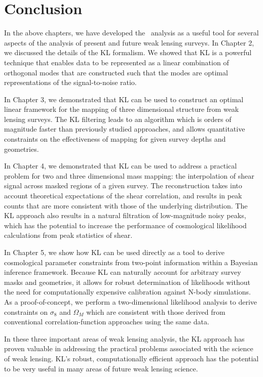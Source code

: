 \chapter{Conclusion}
In the above chapters, we have developed the \KL\ analysis as a useful tool
for several aspects of the analysis of present and future weak lensing
surveys.  In Chapter 2, we discussed the details of the KL formalism.
We showed that KL is a powerful technique that enables data to be represented
as a linear combination of orthogonal modes that are constructed such that
the modes are optimal representations of the signal-to-noise ratio.

In Chapter 3, we demonstrated that KL can be used to construct an optimal
linear framework for the mapping of three dimensional structure from weak
lensing surveys.  The KL filtering leads to an algorithm which is orders of
magnitude faster than previously studied approaches, and allows quantitative
constraints on the effectiveness of mapping for given survey depths and
geometries.

In Chapter 4, we demonstrated that KL can be used to address a practical problem
for two and three dimensional mass mapping: the interpolation of shear signal
across masked regions of a given survey.  The reconstruction takes into
account theoretical expectations of the shear correlation, and results in
peak counts that are more consistent with those of the underlying
distribution.  The KL approach also results in a natural filtration of
low-magnitude noisy peaks, which has the potential to increase the
performance of cosmological likelihood calculations from peak statistics
of shear.

In Chapter 5, we show how KL can be used directly as a tool to derive
cosmological parameter constraints from two-point information within
a Bayesian inference framework. Because KL can naturally account for 
arbitrary survey masks and geometries, it allows for robust determination
of likelihoods without the need for computationally expensive calibration
against N-body simulations.
As a proof-of-concept, we perform a
two-dimensional likelihood analysis to derive constraints on $\sigma_8$
and $\Omega_M$ which are consistent with those derived from conventional
correlation-function approaches using the same data.

In these three important areas of weak lensing analysis, the KL approach
has proven valuable in addressing the practical problems associated with
the science of weak lensing.  KL's robust, computationally efficient approach
has the potential to be very useful in many areas of future weak lensing
science.

